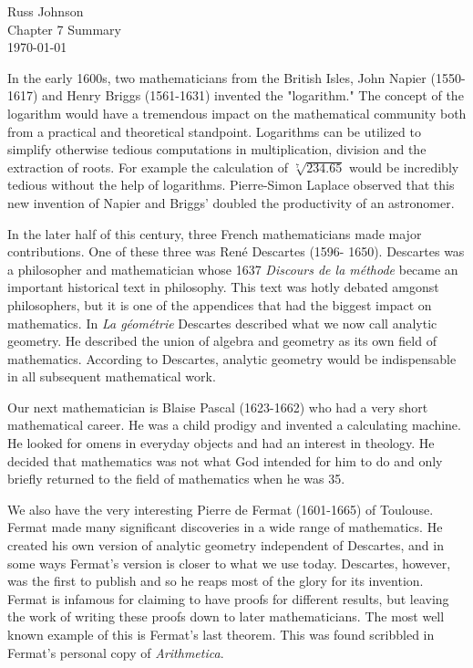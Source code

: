 \documentclass[12pt]{article}
\begin{document}
\begin{flushright}
Russ Johnson\\
Chapter 7 Summary\\
\today\\
\end{flushright}

\begin{doublespace}
In the early 1600s, two mathematicians from the British Isles, John Napier (1550-1617) and Henry Briggs (1561-1631) invented the "logarithm." The concept of the logarithm would have a tremendous impact on the mathematical community both from a practical and theoretical standpoint. Logarithms can be utilized to simplify otherwise tedious computations in multiplication, division and the extraction of roots. For example the calculation of $\sqrt[7]{234.65}$ would be incredibly tedious without the help of logarithms. Pierre-Simon Laplace observed that this new invention of Napier and Briggs' doubled the productivity of an astronomer.

In the later half of this century, three French mathematicians made major contributions. One of these three was Ren\'{e} Descartes (1596- 1650). Descartes was a philosopher and mathematician whose 1637 {\it Discours de la m\'{e}thode} became an important historical text in philosophy. This text was hotly debated amgonst philosophers, but it is one of the appendices that had the biggest impact on mathematics. In {\it La g\'{e}om\'{e}trie} Descartes described what we now call analytic geometry. He described the union of algebra and geometry as its own field of mathematics. According to Descartes, analytic geometry would be indispensable in all subsequent mathematical work.

Our next mathematician is Blaise Pascal (1623-1662) who had a very short mathematical career. He was a child prodigy and invented a calculating machine. He looked for omens in everyday objects and had an interest in theology. He decided that mathematics was not what God intended for him to do and only briefly returned to the field of mathematics when he was 35.

We also have the very interesting Pierre de Fermat (1601-1665) of Toulouse. Fermat made many significant discoveries in a wide range of mathematics. He created his own version of analytic geometry independent of Descartes, and in some ways Fermat's version is closer to what we use today. Descartes, however, was the first to publish and so he reaps most of the glory for its invention. Fermat is infamous for claiming to have proofs for different results, but leaving the work of writing these proofs down to later mathematicians. The most well known example of this is Fermat's last theorem. This was found scribbled in Fermat's personal copy of {\it Arithmetica}.
\end{doublespace}
\end{document}
